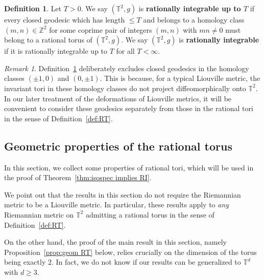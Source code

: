 \documentclass[11pt,letterpaper,oneside]{amsart}
\newcommand{\Z}{\mathbb{Z}}
\newcommand{\T}{\mathbb{T}}
\theoremstyle{definition}
\newtheorem{def1}[theo]{Definition}
\theoremstyle{remark}
\theoremstyle{definition}
\theoremstyle{remark}
\newtheorem*{remark}{Remark}
\begin{document}
\begin{def1}\label{def:RI}
    Let $T > 0$. 
    We say $(\T^2, g)$ is \textbf{rationally integrable up to $T$} if every closed geodesic which has length $\leq T$ and belongs to a homology class $(m,n) \in \Z^2$ for some coprime pair of integers $(m,n)$ with $mn \neq 0$ must belong to a rational torus of $(\T^2, g)$.
    We say $(\T^2, g)$ is \textbf{rationally integrable} if it is rationally integrable up to $T$ for all $T < \infty$.
\end{def1}

\begin{remark}
    Definition~\ref{def:RI} deliberately excludes closed geodesics in the homology classes $(\pm 1,0)$ and $(0,\pm 1)$. 
    This is because, for a typical Liouville metric, the invariant tori in these homology classes do not project diffeomorphically onto $\T^2$.
    In our later treatment of the deformations of Liouville metrics, it will be convenient to consider these geodesics separately from those in the rational tori in the sense of Definition~\ref{def:RT}.
\end{remark}



\subsection{Geometric properties of the rational torus}

In this section, we collect some properties of rational tori, which will be used in the proof of Theorem~\ref{thm:isospec implies RI}.

\medskip

We point out that the results in this section do not require the Riemannian metric to be a Liouville metric.
In particular, these results apply to \emph{any} Riemannian metric on $\T^2$ admitting a rational torus in the sense of Definition~\ref{def:RT}.

\medskip

On the other hand, the proof of the main result in this section, namely Proposition~\ref{prop:geom RT} below, relies crucially on the dimension of the torus being exactly $2$.
In fact, we do not know if our results can be generalized to $\T^d$ with $d \geq 3$.

\medskip
\end{document}
